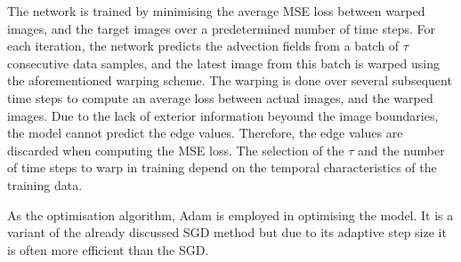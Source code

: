The network is trained by minimising the average MSE loss between warped images, and the target images over a predetermined number of time steps.
For each iteration, the network predicts the advection fields from a batch of $\tau$ consecutive data samples, and the latest image from this batch is warped using the aforementioned warping scheme.
The warping is done over several subsequent time steps to compute an average loss between actual images, and the warped images.
Due to the lack of exterior information beyound the image boundaries, the model cannot predict the edge values.
Therefore, the edge values are discarded when computing the MSE loss.
The selection of the $\tau$ and the number of time steps to warp in training depend on the temporal characteristics of the training data.

As the optimisation algorithm, Adam is employed in optimising the model.
It is a variant of the already discussed SGD method but due to its adaptive step size it is often more efficient than the SGD.
